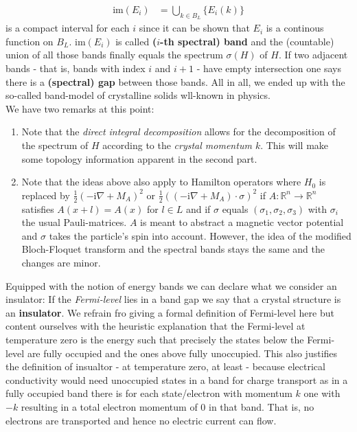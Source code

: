 \begin{align*}
  \mathrm{im}(E_{i})
  &=
  \bigcup_{k \in B_{L}}\lbrace E_{i}(k) \rbrace
\end{align*}
is a compact interval for each $i$ since it can be shown that $E_{i}$ is a continous function on $B_{L}$. $\mathrm{im}(E_{i})$ is called \textbf{($i$-th spectral) band} and the (countable) union of all those bands finally equals the spectrum $\sigma(H)$ of $H$. If two adjacent bands - that is, bands with index $i$ and $i+1$ - have empty intersection one says there is a \textbf{(spectral) gap} between those bands. All in all, we ended up with the so-called band-model of crystalline solids wll-known in physics.
\\
We have two remarks at this point:
\begin{enumerate}
\item
  Note that the \textit{direct integral decomposition} allows for the decomposition of the spectrum of $H$ according to the \textit{crystal momentum $k$}. This will make some topology information apparent in the second part.
\item
  Note that the ideas above also apply to Hamilton operators where $H_{0}$ is replaced by $\frac{1}{2}(-\mathrm{i}\nabla + M_{A})^{2}$ or $\frac{1}{2}((-\mathrm{i}\nabla + M_{A}) \cdot \sigma)^{2}$ if $A \colon \mathbb{R}^{n} \to \mathbb{R}^{n}$ satisfies $A(x + l) = A(x)$ for $l \in L$ and if $\sigma$ equals $(\sigma_{1},\sigma_{2},\sigma_{3})$ with $\sigma_{i}$ the usual Pauli-matrices. $A$ is meant to abstract a magnetic vector potential and $\sigma$ takes the particle's spin into account. However, the idea of the modified Bloch-Floquet transform and the spectral bands stays the same and the changes are minor.
\end{enumerate}
Equipped with the notion of energy bands we can declare what we consider an insulator: If the \textit{Fermi-level} lies in a band gap we say that a crystal structure is an \textbf{insulator}. We refrain fro giving a formal definition of Fermi-level here but content ourselves with the heuristic explanation that the Fermi-level at temperature zero is the energy such that precisely the states below the Fermi-level are fully occupied and the ones above fully unoccupied. This also justifies the definition of insualtor - at temperature zero, at least - because electrical conductivity would need unoccupied states in a band for charge transport as in a fully occupied band there is for each state/electron with momentum $k$ one with $-k$ resulting in a total electron momentum of $0$ in that band. That is, no electrons are transported and hence no electric current can flow.
